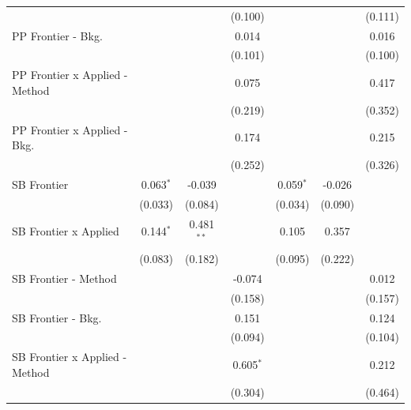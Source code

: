 \begin{tabular}{lcccccc}
                                  &              &              & (0.100)       &              &         & (0.111)\\   
   PP Frontier - Bkg.             &              &              & 0.014         &              &         & 0.016\\   
                                  &              &              & (0.101)       &              &         & (0.100)\\   
   PP Frontier x Applied - Method &              &              & 0.075         &              &         & 0.417\\   
                                  &              &              & (0.219)       &              &         & (0.352)\\   
   PP Frontier x Applied - Bkg.   &              &              & 0.174         &              &         & 0.215\\   
                                  &              &              & (0.252)       &              &         & (0.326)\\   
   SB Frontier                    & 0.063$^{*}$  & -0.039       &               & 0.059$^{*}$  & -0.026  &   \\   
                                  & (0.033)      & (0.084)      &               & (0.034)      & (0.090) &   \\   
   SB Frontier x Applied          & 0.144$^{*}$  & 0.481$^{**}$ &               & 0.105        & 0.357   &   \\   
                                  & (0.083)      & (0.182)      &               & (0.095)      & (0.222) &   \\   
   SB Frontier - Method           &              &              & -0.074        &              &         & 0.012\\   
                                  &              &              & (0.158)       &              &         & (0.157)\\   
   SB Frontier - Bkg.             &              &              & 0.151         &              &         & 0.124\\   
                                  &              &              & (0.094)       &              &         & (0.104)\\   
   SB Frontier x Applied - Method &              &              & 0.605$^{*}$   &              &         & 0.212\\   
                                  &              &              & (0.304)       &              &         & (0.464)\\   

\end{tabular}
